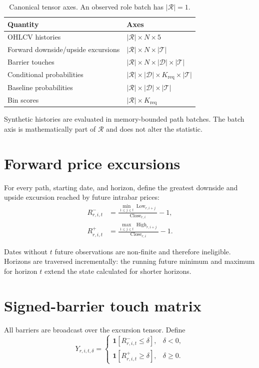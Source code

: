 \documentclass[11pt]{article}
\newcommand{\ind}{\mathbf{1}}
\DeclareMathOperator{\Close}{Close}
\DeclareMathOperator{\High}{High}
\DeclareMathOperator{\Low}{Low}
\begin{document}
\begin{table}[ht]
\centering
\caption{Canonical tensor axes. An observed role batch has $|\mathcal R|=1$.}
\begin{tabular}{ll}
\toprule
Quantity & Axes \\
\midrule
OHLCV histories & $|\mathcal R|\times N\times 5$ \\
Forward downside/upside excursions & $|\mathcal R|\times N\times|\mathcal T|$ \\
Barrier touches & $|\mathcal R|\times N\times|\mathcal D|\times|\mathcal T|$ \\
Conditional probabilities & $|\mathcal R|\times|\mathcal D|\times K_{\mathrm{req}}\times|\mathcal T|$ \\
Baseline probabilities & $|\mathcal R|\times|\mathcal D|\times|\mathcal T|$ \\
Bin scores & $|\mathcal R|\times K_{\mathrm{req}}$ \\
\bottomrule
\end{tabular}
\end{table}

Synthetic histories are evaluated in memory-bounded path batches. The batch
axis is mathematically part of $\mathcal R$ and does not alter the statistic.

\section{Forward price excursions}

For every path, starting date, and horizon, define the greatest downside and
upside excursion reached by future intrabar prices:
\begin{align}
R^-_{r,i,t}
  &= \frac{\min_{1\leq j\leq t}\Low_{r,i+j}}
           {\Close_{r,i}}-1, \\
R^+_{r,i,t}
  &= \frac{\max_{1\leq j\leq t}\High_{r,i+j}}
           {\Close_{r,i}}-1.
\end{align}

Dates without $t$ future observations are non-finite and therefore
ineligible. Horizons are traversed incrementally: the running future minimum
and maximum for horizon $t$ extend the state calculated for shorter horizons.

\section{Signed-barrier touch matrix}

All barriers are broadcast over the excursion tensor. Define
\begin{equation}
Y_{r,i,t,\delta}
=
\begin{cases}
\ind\!\left[R^-_{r,i,t}\leq\delta\right], & \delta<0,\\[2pt]
\ind\!\left[R^+_{r,i,t}\geq\delta\right], & \delta\geq0.
\end{cases}
\end{equation}
\end{document}
